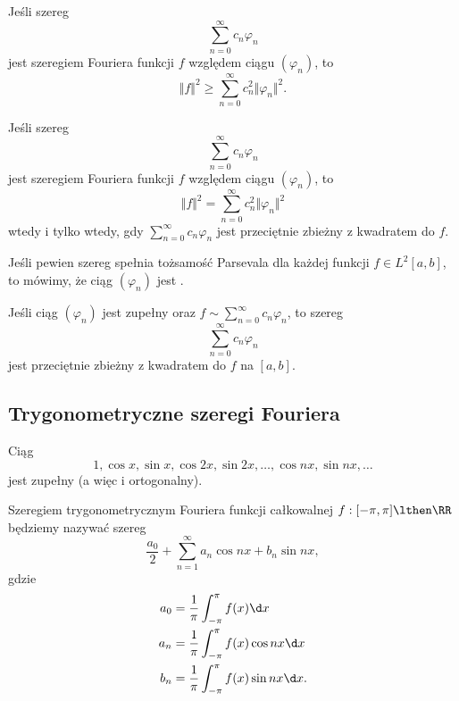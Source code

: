 \begin{theorem}
    Jeśli szereg
    \[ \sum_{n=0}^\infty c_n\varphi_n \]
    jest szeregiem Fouriera funkcji $f$ względem ciągu $(\varphi_n)$, to
    \[ \Vert f \Vert^2 \geq \sum_{n=0}^\infty c_n^2 \Vert \varphi_n \Vert^2. \]
\end{theorem}

\begin{theorem}
    \label{t:Parseval}
    Jeśli szereg
    \[ \sum_{n=0}^\infty c_n\varphi_n \]
    jest szeregiem Fouriera funkcji $f$ względem ciągu $(\varphi_n)$, to
    \[ \Vert f \Vert^2 = \sum_{n=0}^\infty c_n^2 \Vert \varphi_n \Vert^2 \]
    wtedy i tylko wtedy, gdy $\sum_{n=0}^\infty c_n\varphi_n$ jest przeciętnie zbieżny z kwadratem do $f$.
\end{theorem}

Jeśli pewien szereg spełnia tożsamość Parsevala dla każdej funkcji $f \in L^2[a, b]$, to mówimy, że ciąg $(\varphi_n)$ jest .

\begin{corollary}
    Jeśli ciąg $(\varphi_n)$ jest zupełny oraz $f \sim \sum_{n=0}^\infty c_n\varphi_n$, to szereg
    \[ \sum_{n=0}^\infty c_n\varphi_n \]
    jest przeciętnie zbieżny z kwadratem do $f$ na $[a, b]$.
\end{corollary}

\subsection{Trygonometryczne szeregi Fouriera}
\begin{fact}
    Ciąg
    \[ 1, \cos x, \sin x, \cos 2x, \sin 2x, \ldots, \cos nx, \sin nx, \ldots \]
    jest zupełny (a więc i ortogonalny).
\end{fact}

\begin{corollary}
    \label{c:Euler-Fourier for trig}
    Szeregiem trygonometrycznym Fouriera funkcji całkowalnej $f : [-\pi, \pi] \lthen \RR$ będziemy nazywać szereg
    \[ \frac{a_0}{2} + \sum_{n=1}^\infty a_n\cos nx + b_n\sin nx, \]
    gdzie
    \begin{align*}
        a_0 &= \frac{1}{\pi}\int_{-\pi}^\pi f(x) \d x \\
        a_n &= \frac{1}{\pi}\int_{-\pi}^\pi f(x)\cos nx \d x \\
        b_n &= \frac{1}{\pi}\int_{-\pi}^\pi f(x)\sin nx \d x.
    \end{align*}
\end{corollary}


